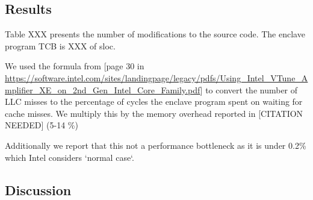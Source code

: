 \documentclass[../main.tex]{subfiles}
\begin{document}
\subsection{Results}

Table XXX presents the number of modifications to the source code.
The enclave program TCB is XXX of sloc.

We used the formula from [page 30 in \url{https://software.intel.com/sites/landingpage/legacy/pdfs/Using_Intel_VTune_Amplifier_XE_on_2nd_Gen_Intel_Core_Family.pdf}]
to convert the number of LLC misses to the percentage of cycles the enclave
program spent on waiting for cache misses. We multiply this by the memory
overhead reported in [CITATION NEEDED] (5-14 \%)

Additionally we report that this not a performance bottleneck as it is under
0.2\% which Intel considers `normal case`.




\subsection{Discussion}
\end{document}
